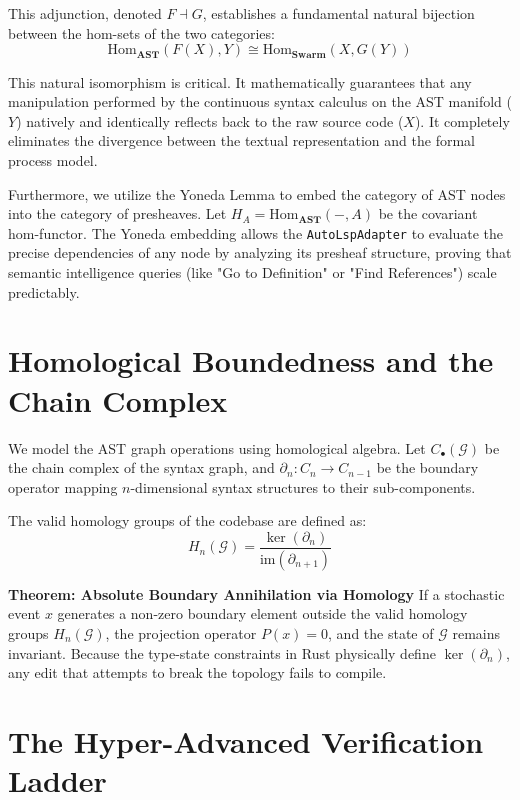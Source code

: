 This adjunction, denoted $F \dashv G$, establishes a fundamental natural bijection between the hom-sets of the two categories:
\begin{equation}
\text{Hom}_{\mathbf{AST}}(F(X), Y) \cong \text{Hom}_{\mathbf{Swarm}}(X, G(Y))
\end{equation}

This natural isomorphism is critical. It mathematically guarantees that any manipulation performed by the continuous syntax calculus on the AST manifold ($Y$) natively and identically reflects back to the raw source code ($X$). It completely eliminates the divergence between the textual representation and the formal process model. 

Furthermore, we utilize the Yoneda Lemma to embed the category of AST nodes into the category of presheaves. Let $H_A = \text{Hom}_{\mathbf{AST}}(-, A)$ be the covariant hom-functor. The Yoneda embedding allows the \texttt{AutoLspAdapter} to evaluate the precise dependencies of any node by analyzing its presheaf structure, proving that semantic intelligence queries (like "Go to Definition" or "Find References") scale predictably.

\section{Homological Boundedness and the Chain Complex}

We model the AST graph operations using homological algebra. Let $C_\bullet(\mathcal{G})$ be the chain complex of the syntax graph, and $\partial_n : C_n \to C_{n-1}$ be the boundary operator mapping $n$-dimensional syntax structures to their sub-components.

The valid homology groups of the codebase are defined as:
\begin{equation}
H_n(\mathcal{G}) = \frac{\ker(\partial_n)}{\text{im}(\partial_{n+1})}
\end{equation}

\textbf{Theorem: Absolute Boundary Annihilation via Homology}
If a stochastic event $x$ generates a non-zero boundary element outside the valid homology groups $H_n(\mathcal{G})$, the projection operator $P(x) = 0$, and the state of $\mathcal{G}$ remains invariant. Because the type-state constraints in Rust physically define $\ker(\partial_n)$, any edit that attempts to break the topology fails to compile.

\section{The Hyper-Advanced Verification Ladder}


